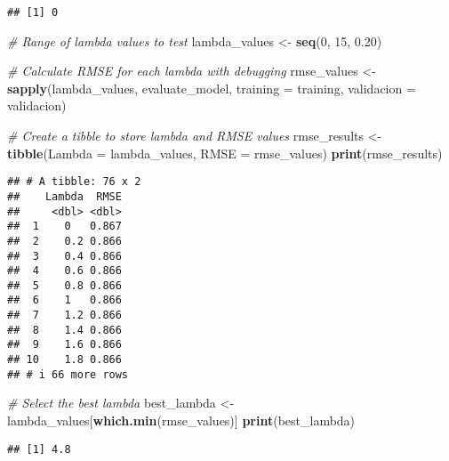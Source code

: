 \documentclass[
]{article}
\newenvironment{Shaded}{\begin{snugshade}}{\end{snugshade}}
\newcommand{\AttributeTok}[1]{\textcolor[rgb]{0.13,0.29,0.53}{#1}}
\newcommand{\CommentTok}[1]{\textcolor[rgb]{0.56,0.35,0.01}{\textit{#1}}}
\newcommand{\DecValTok}[1]{\textcolor[rgb]{0.00,0.00,0.81}{#1}}
\newcommand{\FloatTok}[1]{\textcolor[rgb]{0.00,0.00,0.81}{#1}}
\newcommand{\FunctionTok}[1]{\textcolor[rgb]{0.13,0.29,0.53}{\textbf{#1}}}
\newcommand{\NormalTok}[1]{#1}
\newcommand{\OtherTok}[1]{\textcolor[rgb]{0.56,0.35,0.01}{#1}}
\begin{document}
\begin{verbatim}
## [1] 0
\end{verbatim}

\begin{Shaded}
\begin{Highlighting}[]
\CommentTok{\# Range of lambda values to test}
\NormalTok{lambda\_values }\OtherTok{\textless{}{-}} \FunctionTok{seq}\NormalTok{(}\DecValTok{0}\NormalTok{, }\DecValTok{15}\NormalTok{, }\FloatTok{0.20}\NormalTok{)}

\CommentTok{\# Calculate RMSE for each lambda with debugging}
\NormalTok{rmse\_values }\OtherTok{\textless{}{-}} \FunctionTok{sapply}\NormalTok{(lambda\_values, evaluate\_model, }\AttributeTok{training =}\NormalTok{ training, }\AttributeTok{validacion =}\NormalTok{ validacion)}

\CommentTok{\# Create a tibble to store lambda and RMSE values}
\NormalTok{rmse\_results }\OtherTok{\textless{}{-}} \FunctionTok{tibble}\NormalTok{(}\AttributeTok{Lambda =}\NormalTok{ lambda\_values, }\AttributeTok{RMSE =}\NormalTok{ rmse\_values)}
\FunctionTok{print}\NormalTok{(rmse\_results)}
\end{Highlighting}
\end{Shaded}

\begin{verbatim}
## # A tibble: 76 x 2
##    Lambda  RMSE
##     <dbl> <dbl>
##  1    0   0.867
##  2    0.2 0.866
##  3    0.4 0.866
##  4    0.6 0.866
##  5    0.8 0.866
##  6    1   0.866
##  7    1.2 0.866
##  8    1.4 0.866
##  9    1.6 0.866
## 10    1.8 0.866
## # i 66 more rows
\end{verbatim}

\begin{Shaded}
\begin{Highlighting}[]
\CommentTok{\# Select the best lambda}
\NormalTok{best\_lambda }\OtherTok{\textless{}{-}}\NormalTok{ lambda\_values[}\FunctionTok{which.min}\NormalTok{(rmse\_values)]}
\FunctionTok{print}\NormalTok{(best\_lambda)}
\end{Highlighting}
\end{Shaded}

\begin{verbatim}
## [1] 4.8
\end{verbatim}
\end{document}
